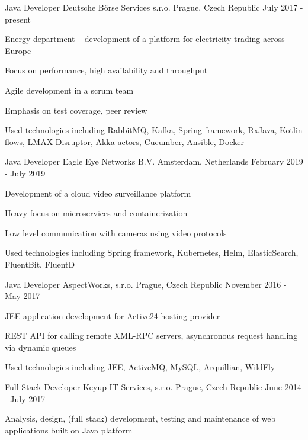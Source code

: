 \begin{cventries}
  \cventry
	{Java Developer}
	{Deutsche Börse Services s.r.o.}
	{Prague, Czech Republic}
	{July 2017 - present}
	{
	  \begin{cvitems}
	    \item {Energy department -- development of a platform for electricity trading across Europe}
	    \item {Focus on performance, high availability and throughput}
	    \item {Agile development in a scrum team}
	    \item {Emphasis on test coverage, peer review}
	    \item {Used technologies including RabbitMQ, Kafka, Spring framework, RxJava, Kotlin flows, LMAX Disruptor, Akka actors, Cucumber, Ansible, Docker}
	  \end{cvitems}
	}
  \cventry
	{Java Developer}
	{Eagle Eye Networks B.V.}
	{Amsterdam, Netherlands}
	{February 2019 - July 2019}
	{
	  \begin{cvitems}
	    \item {Development of a cloud video surveillance platform}
	    \item {Heavy focus on microservices and containerization}
	    \item {Low level communication with cameras using video protocols}
	    \item {Used technologies including Spring framework, Kubernetes, Helm, ElasticSearch, FluentBit, FluentD}
	  \end{cvitems}
	}
  \cventry
    {Java Developer}
    {AspectWorks, s.r.o.}
    {Prague, Czech Republic}
    {November 2016 - May 2017}
    {
      \begin{cvitems}
        \item {JEE application development for Active24 hosting provider}
        \item {REST API for calling remote XML-RPC servers, asynchronous request handling via dynamic queues}
        \item {Used technologies including JEE, ActiveMQ, MySQL, Arquillian, WildFly}
      \end{cvitems}
    }
  \cventry
    {Full Stack Developer}
    {Keyup IT Services, s.r.o.}
    {Prague, Czech Republic}
    {June 2014 - July 2017}
    {
      \begin{cvitems}
        \item {Analysis, design, (full stack) development, testing and maintenance of web applications built on Java platform}

\end{cvitems}}
\end{cventries}
